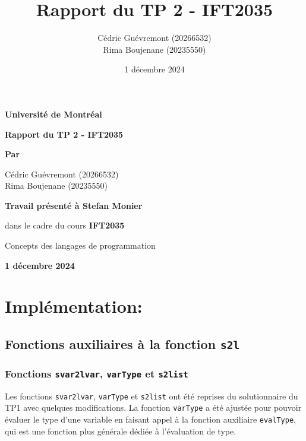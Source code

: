 \documentclass{article}
\title{\textbf{Rapport du TP 2 - IFT2035}}
\author{
  Cédric Guévremont (20266532)\\
  Rima Boujenane (20235550)
}
\date{1 décembre 2024}
\begin{document}
\begin{titlepage}
    \centering
    {\Huge \textbf{Université de Montréal} \par}
    \vspace{2cm}
    
    {\LARGE \textbf{Rapport du TP 2 - IFT2035}\par}
    \vspace{3.5cm}
    {\Large \textbf{Par} \par}

    {\Large Cédric Guévremont (20266532) \\ Rima Boujenane (20235550)\par}

    \vspace{5cm}
    {\Large \textbf{Travail présenté à Stefan Monier}\par}
    {\Large dans le cadre du cours \textbf{IFT2035}\par}
    {\Large Concepts des langages de programmation\par}

    
    \vfill
    {\Large \textbf{1 décembre 2024}\par}
    
\end{titlepage}

\begin{center}
    \tableofcontents
\end{center}

\newpage
\section{Implémentation: }

\subsection{Fonctions auxiliaires à la fonction \texttt{s2l} }
\subsubsection{Fonctions \texttt{svar2lvar}, \texttt{varType} et \texttt{s2list}}
Les fonctions \texttt{svar2lvar}, \texttt{varType} et \texttt{s2list} ont été reprises du solutionnaire du TP1 avec quelques modifications. 
La fonction \texttt{varType} a été ajustée pour pouvoir évaluer le type d'une variable en faisant appel à la fonction auxiliaire \texttt{evalType}, qui est une fonction plus générale dédiée à l'évaluation de type.
\end{document}
